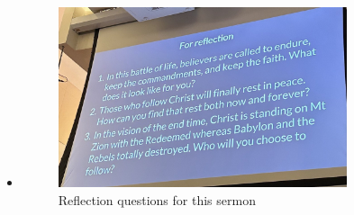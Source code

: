 \begin{itemize}
{\begin{figure}[H]
    \label{}
  \end{figure}}
  \item{\begin{figure}[H]
    \centering
    \includegraphics[width=0.8\textwidth, trim={0cm 0cm 0cm 0cm},clip]{Figures/marSermon3Reflections.jpg}
    \caption[]{Reflection questions for this sermon}
    \label{}
  \end{figure}}
\end{itemize}